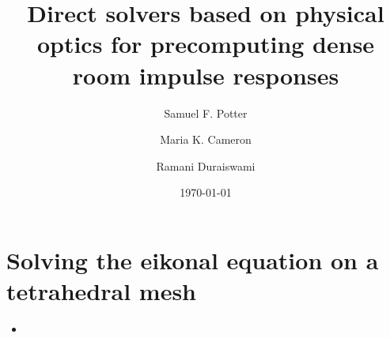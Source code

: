 \documentclass{article}
\begin{document}
\title{Direct solvers based on physical optics for precomputing dense room impulse responses}
\author{Samuel F. Potter \and Maria K. Cameron \and Ramani Duraiswami}
\date{\today}

\maketitle

\section{Solving the eikonal equation on a tetrahedral mesh}

\begin{itemize}
\item {}
\end{itemize}
\end{document}
